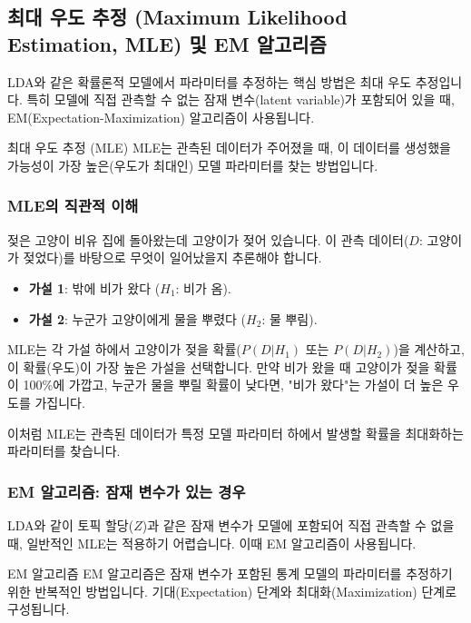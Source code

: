 \documentclass[11pt,a4paper]{article}
\begin{document}
\newpage
\subsection{최대 우도 추정 (Maximum Likelihood Estimation, MLE) 및 EM 알고리즘}
LDA와 같은 확률론적 모델에서 파라미터를 추정하는 핵심 방법은 최대 우도 추정입니다. 특히 모델에 직접 관측할 수 없는 잠재 변수(latent variable)가 포함되어 있을 때, EM(Expectation-Maximization) 알고리즘이 사용됩니다.

\begin{definitionbox}{최대 우도 추정 (MLE)}
MLE는 관측된 데이터가 주어졌을 때, 이 데이터를 생성했을 가능성이 가장 높은(우도가 최대인) 모델 파라미터를 찾는 방법입니다.
\end{definitionbox}

\subsubsection{MLE의 직관적 이해}
\begin{examplebox}{젖은 고양이 비유}
집에 돌아왔는데 고양이가 젖어 있습니다. 이 관측 데이터($D$: 고양이가 젖었다)를 바탕으로 무엇이 일어났을지 추론해야 합니다.
\begin{itemize}
    \item \textbf{가설 1}: 밖에 비가 왔다 ($H_1$: 비가 옴).
    \item \textbf{가설 2}: 누군가 고양이에게 물을 뿌렸다 ($H_2$: 물 뿌림).
\end{itemize}
MLE는 각 가설 하에서 고양이가 젖을 확률($P(D|H_1)$ 또는 $P(D|H_2)$)을 계산하고, 이 확률(우도)이 가장 높은 가설을 선택합니다. 만약 비가 왔을 때 고양이가 젖을 확률이 100\%에 가깝고, 누군가 물을 뿌릴 확률이 낮다면, "비가 왔다"는 가설이 더 높은 우도를 가집니다.
\end{examplebox}
이처럼 MLE는 관측된 데이터가 특정 모델 파라미터 하에서 발생할 확률을 최대화하는 파라미터를 찾습니다.

\subsubsection{EM 알고리즘: 잠재 변수가 있는 경우}
LDA와 같이 토픽 할당($Z$)과 같은 잠재 변수가 모델에 포함되어 직접 관측할 수 없을 때, 일반적인 MLE는 적용하기 어렵습니다. 이때 EM 알고리즘이 사용됩니다.

\begin{definitionbox}{EM 알고리즘}
EM 알고리즘은 잠재 변수가 포함된 통계 모델의 파라미터를 추정하기 위한 반복적인 방법입니다. 기대(Expectation) 단계와 최대화(Maximization) 단계로 구성됩니다.
\end{definitionbox}
\end{document}
